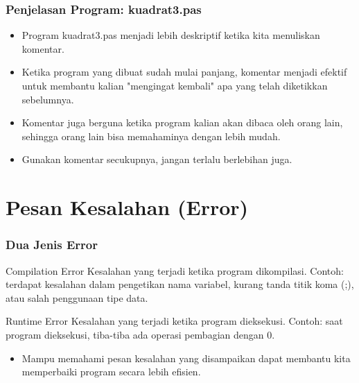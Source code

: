 \documentclass{beamer}
\begin{document}
\begin{frame}
\frametitle{Penjelasan Program: kuadrat3.pas}
\begin{itemize}
    \item Program kuadrat3.pas menjadi lebih deskriptif ketika kita menuliskan komentar.
    \item Ketika program yang dibuat sudah mulai panjang, komentar menjadi efektif untuk membantu kalian "mengingat kembali" apa yang telah diketikkan sebelumnya.
    \item Komentar juga berguna ketika program kalian akan dibaca oleh orang lain, sehingga orang lain bisa memahaminya dengan lebih mudah.
    \item Gunakan komentar secukupnya, jangan terlalu berlebihan juga.
\end{itemize}
\end{frame}

\section{Pesan Kesalahan (Error)}
\frame{\sectionpage}

\begin{frame}
\frametitle{Dua Jenis Error}
\begin{block}{Compilation Error}
    Kesalahan yang terjadi ketika program dikompilasi.\newline
    Contoh: terdapat kesalahan dalam pengetikan nama variabel, kurang tanda titik koma (;), atau salah penggunaan tipe data.
\end{block}
\begin{block}{Runtime Error}
    Kesalahan yang terjadi ketika program dieksekusi.\newline
    Contoh: saat program dieksekusi, tiba-tiba ada operasi pembagian dengan 0.
\end{block}

\begin{itemize}
    \item Mampu memahami pesan kesalahan yang disampaikan dapat membantu kita memperbaiki program secara lebih efisien.
\end{itemize}
\end{frame}
\end{document}
